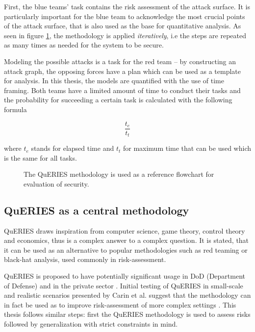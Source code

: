 First, the blue teams' task contains the risk assessment of the attack
surface. It is particularly important for the blue team to acknowledge
the most crucial points of the attack surface, that is also used as
the base for quantitative analysis. As seen in figure
\ref{queries}, the methodology is applied \textit{iteratively}, i.e
the steps are repeated as many times as needed for the system to be
secure.

Modeling the possible attacks is a task for the red team – by
constructing an attack graph, the opposing forces have a plan which
can be used as a template for analysis. In this thesis, the models are quantified with the use of time
framing. Both teams have a limited amount of time to conduct their
tasks and the probability for succeeding a certain task is calculated
with the following formula

\[ \frac{t_e}{t_t} \]

where \(t_e\) stands for elapsed time and \(t_t\) for maximum time
that can be used which is the same for all tasks.

\begin{figure}[t!]
\centerline{}
\caption{The QuERIES methodology is used as a reference flowchart for
  evaluation of security. \cite{hughes2013quantitative}}
\label{queries}
\end{figure}
\subsection{QuERIES as a central methodology} \label{queriesasmethodology}

QuERIES draws inspiration from computer science, game theory, control
theory and economics, thus is a complex answer to a complex
question. It is stated, that it can be used as an alternative to
popular methodologies such as red teaming or black-hat analysis, used
commonly in risk-assessment. \cite{carin2008cybersecurity}

QuERIES is proposed to have potentially significant usage in DoD
(Department of Defense) and in the private sector
\cite{carin2008cybersecurity}. Initial testing of QuERIES in
small-scale and realistic scenarios presented by Carin et al. suggest
that the methodology can in fact be used as to improve risk-assessment of
more complex settings \cite{carin2008cybersecurity}. This thesis
follows similar steps: first the QuERIES methodology is used to assess
risks followed by generalization with strict constraints in mind.


